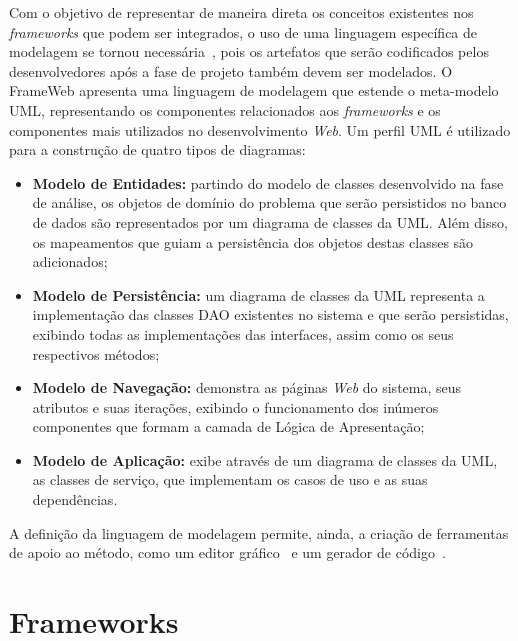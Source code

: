 Com o objetivo de representar de maneira direta os conceitos existentes nos \textit{frameworks} que podem ser integrados, o uso de uma linguagem específica de modelagem se tornou necessária~\cite{martins-souza:webmedia15}, pois os artefatos que serão codificados pelos desenvolvedores após a fase de projeto também devem ser modelados. O FrameWeb apresenta uma linguagem de modelagem que estende o meta-modelo UML, representando os componentes relacionados aos \textit{frameworks} e os componentes mais utilizados no desenvolvimento \textit{Web}. Um perfil UML é utilizado para a construção de quatro tipos de diagramas: 

\begin{itemize}  

	\item \textbf{Modelo de Entidades:} partindo do modelo de classes desenvolvido na fase de análise, os objetos de domínio do problema que serão persistidos no banco de dados são representados por um diagrama de classes da UML. Além disso, os mapeamentos que guiam a persistência dos objetos destas classes são adicionados;
	
	\item \textbf{Modelo de Persistência:} um diagrama de classes da UML representa a implementação das classes DAO existentes no sistema e que serão persistidas, exibindo todas as implementações das interfaces, assim como os seus respectivos métodos;
	
	\item \textbf{Modelo de Navegação:} demonstra as páginas \textit{Web} do sistema, seus atributos e suas iterações, exibindo o funcionamento dos inúmeros componentes que formam a camada de Lógica de Apresentação;
	
	\item \textbf{Modelo de Aplicação:} exibe através de um diagrama de classes da UML, as classes de serviço, que implementam os casos de uso e as suas dependências.

\end{itemize}

A definição da linguagem de modelagem permite, ainda, a criação de ferramentas de apoio ao método, como um editor gráfico~\cite{campos-souza:webmedia17} e um gerador de código~\cite{almeida-et-al:webmedia17}.



\section{Frameworks}
\label{sec-ref-frameworks}

